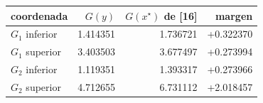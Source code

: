\begin{tabular}{lrrr}
\toprule
coordenada & $G(y)$ & $G(x^\star)$ de [16] & margen \\
\midrule
$G_1$ inferior & 1.414351 & 1.736721 & +0.322370 \\
$G_1$ superior & 3.403503 & 3.677497 & +0.273994 \\
$G_2$ inferior & 1.119351 & 1.393317 & +0.273966 \\
$G_2$ superior & 4.712655 & 6.731112 & +2.018457 \\
\bottomrule
\end{tabular}
